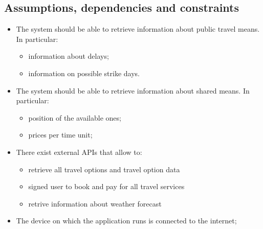 \subsection{ Assumptions, dependencies and constraints}

\begin{itemize}
\item The system should be able to retrieve information about public travel means. In particular:
\begin{itemize}
\item information about delays;
\item information on possible strike days.
\end{itemize}

\item The system should be able to retrieve information about shared means. In particular:
\begin{itemize}
\item position of the available ones;
\item prices per time unit;
\end{itemize}

\item There exist external APIs that allow to:
\begin{itemize}
\item retrieve all travel options and travel option data
\item signed user to book and pay for all travel services
\item retrive information about weather forecast
\end{itemize}


\item The device on which the application runs is connected to the internet;

\end{itemize}





